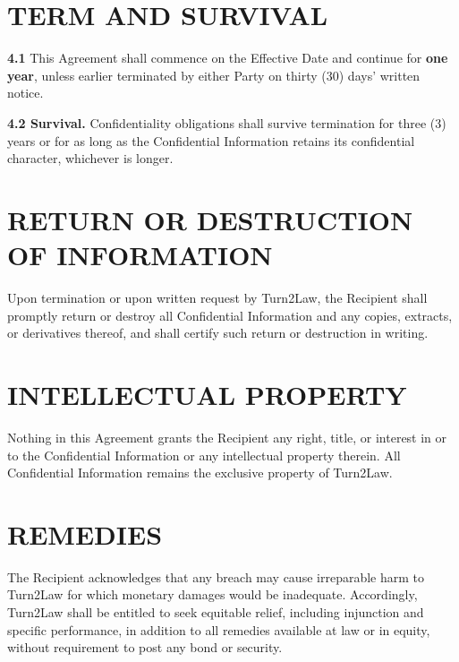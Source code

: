 \documentclass[10pt]{article}
\begin{document}
\section{TERM AND SURVIVAL}

\textbf{4.1} This Agreement shall commence on the Effective Date and continue for \textbf{one year}, unless earlier terminated by either Party on thirty (30) days' written notice.

\textbf{4.2 Survival.} Confidentiality obligations shall survive termination for three (3) years or for as long as the Confidential Information retains its confidential character, whichever is longer.

\section{RETURN OR DESTRUCTION OF INFORMATION}

Upon termination or upon written request by Turn2Law, the Recipient shall promptly return or destroy all Confidential Information and any copies, extracts, or derivatives thereof, and shall certify such return or destruction in writing.

\section{INTELLECTUAL PROPERTY}

Nothing in this Agreement grants the Recipient any right, title, or interest in or to the Confidential Information or any intellectual property therein. All Confidential Information remains the exclusive property of Turn2Law.

\section{REMEDIES}

The Recipient acknowledges that any breach may cause irreparable harm to Turn2Law for which monetary damages would be inadequate. Accordingly, Turn2Law shall be entitled to seek equitable relief, including injunction and specific performance, in addition to all remedies available at law or in equity, without requirement to post any bond or security.
\end{document}
